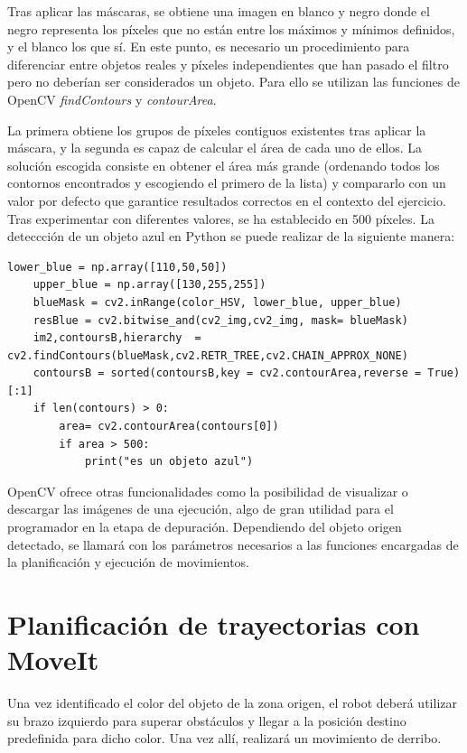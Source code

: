 \documentclass[12pt,spanish,chapterprefix, numbers=noenddot]{book}
\numberwithin{equation}{section}
\numberwithin{figure}{section}
\begin{document}
Tras aplicar las máscaras, se obtiene una imagen en blanco y negro donde el negro representa los píxeles que no están entre los máximos y mínimos definidos, y el blanco los que sí. En este punto, es necesario un procedimiento para diferenciar entre objetos reales y píxeles independientes que han pasado el filtro pero no deberían ser considerados un objeto. Para ello se utilizan las funciones de OpenCV \textit{findContours} y \textit{contourArea}. 

La primera obtiene los grupos de píxeles contiguos existentes tras aplicar la máscara, y la segunda es capaz de calcular el área de cada uno de ellos. La solución escogida consiste en obtener el área más grande (ordenando todos los contornos encontrados y escogiendo el primero de la lista) y compararlo con un valor por defecto que garantice resultados correctos en el contexto del ejercicio. Tras experimentar con diferentes valores, se ha establecido en 500 píxeles. La deteccción de un objeto azul en Python se puede realizar de la siguiente manera: 
\vspace{20pt}
    \begin{lstlisting}[frame=single] 
    lower_blue = np.array([110,50,50])
    upper_blue = np.array([130,255,255])
    blueMask = cv2.inRange(color_HSV, lower_blue, upper_blue)
    resBlue = cv2.bitwise_and(cv2_img,cv2_img, mask= blueMask)
    im2,contoursB,hierarchy  = cv2.findContours(blueMask,cv2.RETR_TREE,cv2.CHAIN_APPROX_NONE)
    contoursB = sorted(contoursB,key = cv2.contourArea,reverse = True)[:1] 
    if len(contours) > 0:
        area= cv2.contourArea(contours[0])
        if area > 500:
            print("es un objeto azul")
    \end{lstlisting}

OpenCV ofrece otras funcionalidades como la posibilidad de visualizar o descargar las imágenes de una ejecución, algo de gran utilidad para el programador en la etapa de depuración. 
Dependiendo del objeto origen detectado, se llamará con los parámetros necesarios a las funciones encargadas de la planificación y ejecución de movimientos.

\section{Planificación de trayectorias con MoveIt}
Una vez identificado el color del objeto de la zona origen, el robot deberá utilizar su brazo izquierdo para superar obstáculos y llegar a la posición destino predefinida para dicho color. Una vez allí, realizará un movimiento de derribo. 
\end{document}
